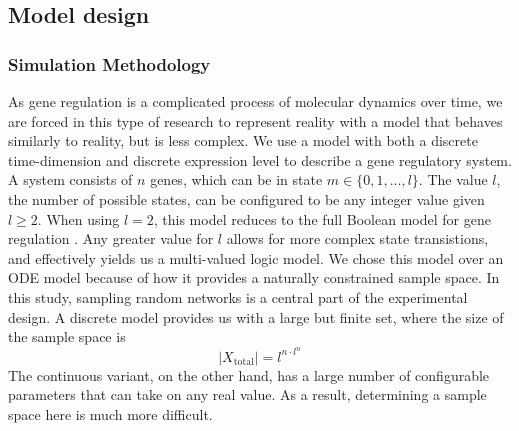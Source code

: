 \documentclass[../main.tex]{subfiles}
\begin{document}
\subsection{Model design}

\subsubsection{Simulation Methodology}


As gene regulation is a complicated process of molecular dynamics over time, we are forced in this type of research to represent reality with a model that behaves similarly to reality, but is less complex.
We use a model with both a discrete time-dimension and discrete expression level to describe a gene regulatory system.
A system consists of $n$ genes, which can be in state $m \in \{0, 1, ..., l\}$.
The value $l$, the number of possible states, can be configured to be any integer value given $l \ge 2$.
When using $l = 2$, this model reduces to the full Boolean model for gene regulation \cite{bolouri2002modeling}.
Any greater value for $l$ allows for more complex state transistions, and effectively yields us a multi-valued logic model.
We chose this model over an ODE model because of how it provides a naturally constrained sample space. %
In this study, sampling random networks is a central part of the experimental design.
A discrete model provides us with a large but finite set, where the size of the sample space is
%
\begin{equation}
|X_\mathrm{total}| = l^{n \cdot l^n}
\end{equation}
%
The continuous variant, on the other hand, has a large number of configurable parameters that can take on any real value.
As a result, determining a sample space here is much more difficult. %
\end{document}
